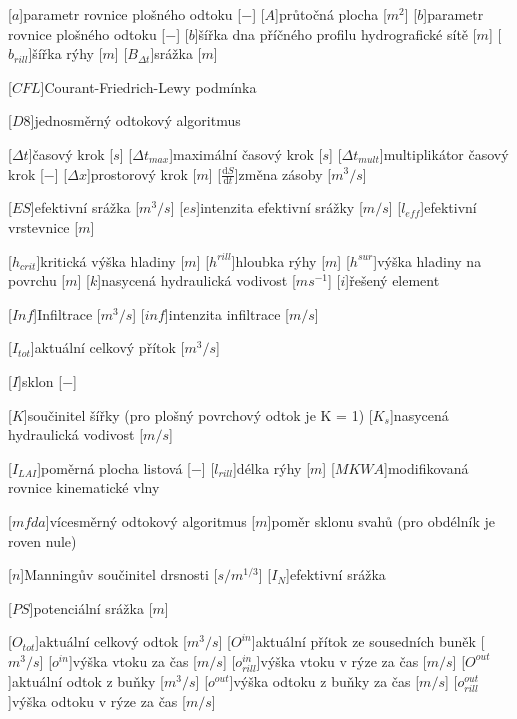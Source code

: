 \begin{acronym}
\setlength{\parskip}{0ex}
\setlength{\itemsep}{1ex}

[$a$]{parametr rovnice plošného odtoku [$-$]}
[$A$]{průtočná plocha  [$m^{2}$]}
[$b$]{parametr rovnice plošného odtoku [$-$]}
[$b$]{šířka dna příčného profilu hydrografické sítě [$m$]}
[$b_{rill}$]{šířka rýhy [$m$]}
[$B_{\Delta t}$]{srážka [$m$]}

[$CFL$]{Courant-Friedrich-Lewy podmínka}


[$D8$]{jednosměrný odtokový algoritmus}

[$\Delta t$]{časový krok [$s$]}
[$\Delta t_{max}$]{maximální časový krok [$s$]}
[$\Delta t_{mult}$]{multiplikátor časový krok [$-$]}
[$\Delta x$]{prostorový krok [$m$]}
[$\frac{\mathrm{d}S}{\mathrm{d}t}$]{změna zásoby [$m^3/s$]}

[$ES$]{efektivní srážka [$m^3/s$]}
[$es$]{intenzita efektivní srážky [$m/s$]}
[$l_{eff}$]{efektivní vrstevnice [$m$]}

[$h_{crit}$]{kritická výška hladiny [$m$]}
[$h^{rill}$]{hloubka rýhy [$m$]}
[$h^{sur}$]{výška hladiny na povrchu [$m$]}
[$k$]{nasycená hydraulická vodivost [$m s^{-1}$]}
[$i$]{řešený element}

[$Inf$]{Infiltrace [$m^3/s$]}
[$inf$]{intenzita infiltrace [$m/s$]}

[$I_{tot}$]{aktuální celkový přítok [$m^3/s$]}

[$I$]{sklon [$-$]}

[$K$]{součinitel šířky (pro plošný povrchový odtok je K = 1)}
[$K_s$]{nasycená hydraulická vodivost [$m/s$]}

[$I_{LAI}$]{poměrná plocha listová [$-$]}
[$l_{rill}$]{délka rýhy [$m$]}
[$MKWA$]{modifikovaná rovnice kinematické vlny}

[$mfda$]{vícesměrný odtokový algoritmus}
[$m$]{poměr sklonu svahů (pro obdélník je roven nule)}

[$n$]{Manningův součinitel drsnosti [$s/m^{1/3}$]}
[$I_{N}$]{efektivní srážka}

[$PS$]{potenciální srážka [$m$]}

[$O_{tot}$]{aktuální celkový odtok [$m^{3}/s$]}
[$O^{in}$]{aktuální přítok ze sousedních buněk [$m^{3}/s$]}
[$o^{in}$]{výška vtoku za čas [$m/s$]}
[$o^{in}_{rill}$]{výška vtoku v rýze za čas [$m/s$]}
[$O^{out}$]{aktuální odtok z buňky [$m^{3}/s$]}
[$o^{out}$]{výška odtoku z buňky  za čas [$m/s$]}
[$o^{out}_{rill}$]{výška odtoku v rýze za čas [$m/s$]}



\end{acronym}
